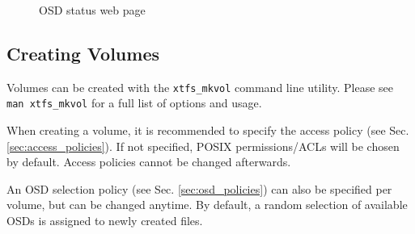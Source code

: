\documentclass[a4paper,10pt]{book}
\begin{document}
\begin{figure}[h]
 \centering
 \caption{OSD status web page}
 \label{fig:screenshot_status}
\end{figure}


\subsection{Creating Volumes}
\label{sec:create_volume}

Volumes can be created with the \texttt{xtfs\_mkvol} command line utility. Please see \texttt{man xtfs\_mkvol} for a full list of options and usage.

When creating a volume, it is recommended to specify the access policy (see Sec. \ref{sec:access_policies}). If not specified, POSIX permissions/ACLs will be chosen by default. Access policies cannot be changed afterwards.

An OSD selection policy (see Sec. \ref{sec:osd_policies}) can also be specified per volume, but can be changed anytime. By default, a random selection of available OSDs is assigned to newly created files.
\end{document}
